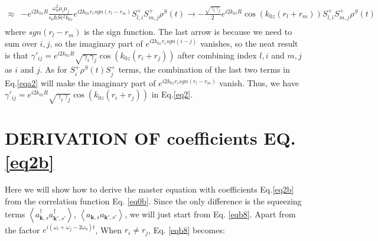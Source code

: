 \documentclass[aps,showpacs,twocolumn,twoside,groupedaddress]{revtex4}
\let\vec\bm
\begin{document}
\begin{widetext}
\begin{equation}
\begin{split}
\approx&-e^{i2k_{0z}R}\frac{\omega_{0}^{2}\mu_{i}\mu_{j}}{\epsilon_{0}\hbar Sc^{2}k_{0z}}e^{i2k_{0z}r_{c}sgn(r_{l}-r_{m})}S_{l,i}^{+}S_{m,j}^{+}\rho^{S}(t)\rightarrow-\frac{\sqrt{\gamma_{i}\gamma_{j}}}{2}e^{i2k_{0z}R}\cos(k_{0z}(r_{l}+r_{m}))S_{l,i}^{+}S_{m,j}^{+}\rho^{S}(t)\\
\end{split}
\end{equation}
where $sgn(r_{l}-r_{m})$ is the sign function. The last arrow is because we need to sum over $i,j$, so the imaginary part of $e^{i2k_{0z}r_{c}sgn(i-j)}$ vanishes, so the neat result is that $\gamma'_{ij}=e^{i2k_{0z}R}\sqrt{\gamma_{i}\gamma_{j}}\cos(k_{0z}(r_{i}+r_{j}))$ after combining index $l,i$ and $m,j$ as $i$ and $j$. As for $S_{i}^{+}\rho^{S}(t)S_{j}^{+}$ terms, the combination of the last two terms in Eq.\eqref{eqa2} will make the imaginary part of $e^{i2k_{0z}r_{c}sgn(r_{l}-r_{m})}$ vanish. Thus, we have $\gamma'_{ij}=e^{i2k_{0z}R}\sqrt{\gamma_{i}\gamma_{j}}\cos(k_{0z}(r_i+r_j))$ in Eq.\eqref{eq2}. 

\section{DERIVATION OF coefficients EQ.\eqref{eq2b} }
Here we will show how to derive the master equation with coefficients Eq.\eqref{eq2b} from the correlation function Eq. \eqref{eq0b}. Since the only difference is the squeezing terms $\left\langle a_{\vec{k},s}^{\dagger}a_{\vec{k}',s'}^{\dagger}\right\rangle$, $\left\langle a_{\vec{k},s}a_{\vec{k}',s'}\right\rangle $, we will just start from Eq. \eqref{eqb8}. Apart from the factor $e^{i(\omega_i+\omega_j-2\omega_0)t}$, When $r_i\ne r_j$, Eq. \eqref{eqb8} becomes:


\end{widetext}
\end{document}
